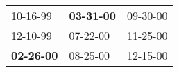 \begin{supertabular}{p{0.33\columnwidth}p{0.33\columnwidth}p{0.33\columnwidth}}
          10-16-99\textsuperscript{} &  \textbf{03-31-00\textsuperscript{}} &  09-30-00\textsuperscript{} \\
          12-10-99\textsuperscript{} &           07-22-00\textsuperscript{} &  11-25-00\textsuperscript{} \\
 \textbf{02-26-00\textsuperscript{}} &           08-25-00\textsuperscript{} &  12-15-00\textsuperscript{} \\
\end{supertabular}
